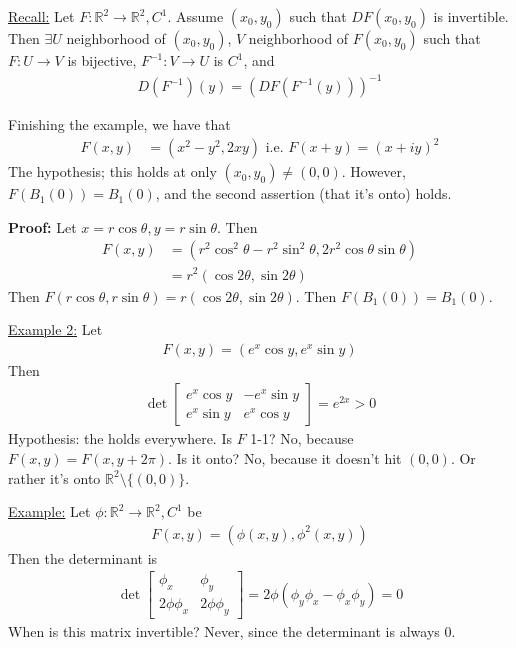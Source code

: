 \documentclass{article}
\newcommand*{\txt}[1]{\text{ #1 }}%
\newcommand*{\rr}{\mathbb{R}}%
\begin{document}
\underline{Recall:} Let $F:\rr^2\to\rr^2, C^1$. Assume $(x_0, y_0)$ such that $DF(x_0,y_0)$ is invertible. Then $\exists U$ neighborhood of $(x_0,y_0)$, $V$ neighborhood of $F(x_0,y_0)$ such that $F:U\to V$ is bijective, $F^{-1}:V\to U$ is $C^1$, and \begin{align*}
    D(F^{-1})(y)=(DF(F^{-1}(y)))^{-1}
\end{align*}

Finishing the example, we have that \begin{align*}
    F(x,y)&=(x^2-y^2,2xy)\txt{i.e.}F(x+y)=(x+iy)^2
\end{align*}The hypothesis; this holds at only $(x_0,y_0)\neq (0,0)$. However, $F(B_1(0))=B_1(0)$, and the second assertion (that it's onto) holds. 

\textbf{Proof:} Let $x=r\cos \theta,y=r\sin\theta$. Then \begin{align*}
    F(x,y)&=(r^2\cos^2\theta-r^2\sin^2\theta,2r^2\cos\theta\sin\theta)\\
    &=r^2(\cos 2\theta,\sin 2\theta)
\end{align*} Then $F(r\cos\theta,r\sin\theta)=r(\cos 2\theta,\sin 2\theta)$. Then $F(B_1(0))=B_1(0)$.

\underline{Example 2:} Let \begin{align*}
    F(x,y)=(e^x\cos y,e^x\sin y)
\end{align*} Then \begin{align*}
    \det\begin{bmatrix}
        e^x\cos y & -e^x\sin y\\
        e^x\sin y & e^x\cos y
    \end{bmatrix}=e^{2x}>0
\end{align*}Hypothesis: the holds everywhere. Is $F$ 1-1? No, because $F(x,y)=F(x,y+2\pi)$. Is it onto? No, because it doesn't hit $(0,0)$. Or rather it's onto $\rr^2\setminus \{(0,0)\}$.

\underline{Example:} Let $\phi:\rr^2\to \rr^2, C^1$ be \begin{align*}
    F(x,y)=(\phi(x,y),\phi^2(x,y))
\end{align*} Then the determinant is \begin{align*}
    \det\begin{bmatrix}
        \phi_x & \phi_y\\
        2\phi\phi_x & 2\phi\phi_y
    \end{bmatrix}=2\phi(\phi_y\phi_x-\phi_x\phi_y)=0
\end{align*} When is this matrix invertible? Never, since the determinant is always 0.
\end{document}
